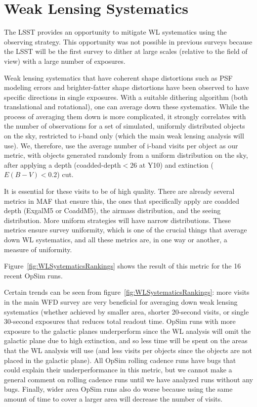 \section{Weak Lensing Systematics}

The LSST provides an opportunity to mitigate WL systematics using the observing strategy. This opportunity was not possible in previous surveys because the LSST will be the first survey to dither at large scales (relative to the field of view) with a large number of exposures.

Weak lensing systematics that have coherent shape distortions such as PSF modeling errors and brighter-fatter shape distortions have been observed to have specific directions in single exposures. With a suitable dithering algorithm (both translational and rotational), one can average down these systematics. While the process of averaging them down is more complicated, it strongly correlates with the number of observations for a set of simulated, uniformly distributed objects on the sky, restricted to i-band only (which the main weak lensing analysis will use). We, therefore, use the average number of i-band visits per object as our metric, with objects generated randomly from a uniform distribution on the sky, after applying a depth (coadded-depth$<26$ at Y10) and extinction ($E(B-V)<0.2$) cut.

It is essential for these visits to be of high quality. There are already several metrics in MAF that ensure this, the ones that specifically apply are coadded depth (ExgalM5 or CoaddM5), the airmass distribution, and the seeing distribution. More uniform strategies will have narrow distributions. These metrics ensure survey uniformity, which is one of the crucial things that average down WL systematics, and all these metrics are, in one way or another, a measure of uniformity.

Figure~\ref{fig:WLSystematicsRankings} shows the result of this metric for the 16 recent OpSim runs. 

Certain trends can be seen from  figure~\ref{fig:WLSystematicsRankings}: more visits in the main WFD survey are very beneficial for averaging down weak lensing systematics (whether achieved by smaller area, shorter 20-second visits, or single 30-second exposures that reduces total readout time. OpSim runs with more exposure to the galactic planes underperform since the WL analysis will omit the galactic plane due to high extinction, and so less time will be spent on the areas that the WL analysis will use (and less visits per objects since the objects are not placed in the galactic plane). All OpSim rolling cadence runs have bugs that could explain their underperformance in this metric, but we cannot make a general comment on rolling cadence runs until we have analyzed runs without any bugs. Finally, wider area OpSim runs also do worse because using the same amount of time to cover a larger area will decrease the number of visits.

